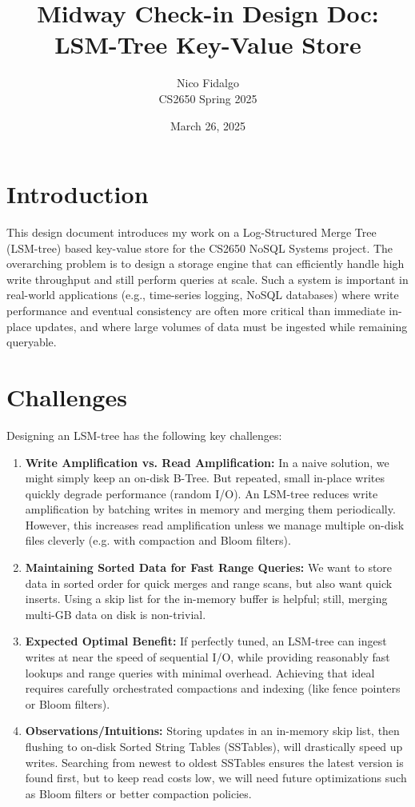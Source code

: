 \documentclass[10pt]{article}
\title{Midway Check-in Design Doc: LSM-Tree Key-Value Store}
\author{Nico Fidalgo \\ CS2650 Spring 2025}
\date{March 26, 2025}
\begin{document}
\maketitle

\section{Introduction}
This design document introduces my work on a Log-Structured Merge Tree (LSM-tree) based key-value store for the CS2650 NoSQL Systems project. 
The overarching problem is to design a storage engine that can efficiently handle high write throughput and still perform queries at scale. 
Such a system is important in real-world applications (e.g., time-series logging, NoSQL databases) where write performance and eventual consistency are often more critical than immediate in-place updates, and where large volumes of data must be ingested while remaining queryable.

\section{Challenges}
Designing an LSM-tree has the following key challenges:
\begin{enumerate}
    \item \textbf{Write Amplification vs. Read Amplification:} 
    In a naive solution, we might simply keep an on-disk B-Tree. But repeated, small in-place writes quickly degrade performance (random I/O). An LSM-tree reduces write amplification by batching writes in memory and merging them periodically. However, this increases read amplification unless we manage multiple on-disk files cleverly (e.g. with compaction and Bloom filters).

    \item \textbf{Maintaining Sorted Data for Fast Range Queries:} 
    We want to store data in sorted order for quick merges and range scans, but also want quick inserts. 
    Using a skip list for the in-memory buffer is helpful; still, merging multi-GB data on disk is non-trivial.

    \item \textbf{Expected Optimal Benefit:} 
    If perfectly tuned, an LSM-tree can ingest writes at near the speed of sequential I/O, while providing reasonably fast lookups and range queries with minimal overhead. 
    Achieving that ideal requires carefully orchestrated compactions and indexing (like fence pointers or Bloom filters).

    \item \textbf{Observations/Intuitions:} 
    Storing updates in an in-memory skip list, then flushing to on-disk Sorted String Tables (SSTables), will drastically speed up writes. 
    Searching from newest to oldest SSTables ensures the latest version is found first, but to keep read costs low, we will need future optimizations such as Bloom filters or better compaction policies.
\end{enumerate}
\end{document}
